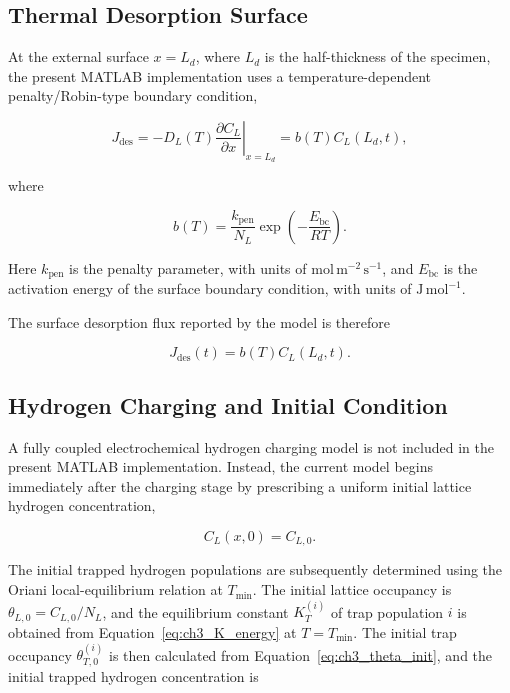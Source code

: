 \documentclass[a4paper,12pt,oneside]{report}
\begin{document}
\subsection{Thermal Desorption Surface}

At the external surface $x=L_d$, where $L_d$ is the half-thickness of the specimen, the present MATLAB implementation
uses a temperature-dependent penalty/Robin-type boundary condition,

\begin{equation}
J_{\mathrm{des}}
=
-D_L(T)
\left.
\frac{\partial C_L}{\partial x}
\right|_{x=L_d}
=
b(T)C_L(L_d,t),
\label{eq:ch3_surface_bc}
\end{equation}

where

\begin{equation}
b(T)
=
\frac{k_{\mathrm{pen}}}{N_L}
\exp\left(
-\frac{E_{\mathrm{bc}}}{RT}
\right).
\label{eq:ch3_bc_factor}
\end{equation}

Here $k_{\mathrm{pen}}$ is the penalty parameter, with units of
$\mathrm{mol\,m^{-2}\,s^{-1}}$, and $E_{\mathrm{bc}}$ is the activation
energy of the surface boundary condition, with units of
$\mathrm{J\,mol^{-1}}$.

The surface desorption flux reported by the model is therefore

\begin{equation}
J_{\mathrm{des}}(t)
=
b(T)C_L(L_d,t).
\label{eq:ch3_desorption_flux}
\end{equation}

\subsection{Hydrogen Charging and Initial Condition}

A fully coupled electrochemical hydrogen charging model is not
included in the present MATLAB implementation. Instead, the current
model begins immediately after the charging stage by prescribing a
uniform initial lattice hydrogen concentration,

\begin{equation}
C_L(x,0)=C_{L,0}.
\end{equation}

The initial trapped hydrogen populations are subsequently determined
using the Oriani local-equilibrium relation at $T_{\min}$. The initial
lattice occupancy is $\theta_{L,0}=C_{L,0}/N_L$, and the equilibrium
constant $K_T^{(i)}$ of trap population $i$ is obtained from
Equation~\eqref{eq:ch3_K_energy} at $T=T_{\min}$. The initial trap
occupancy $\theta_{T,0}^{(i)}$ is then calculated from
Equation~\eqref{eq:ch3_theta_init}, and the initial trapped hydrogen
concentration is
\end{document}
